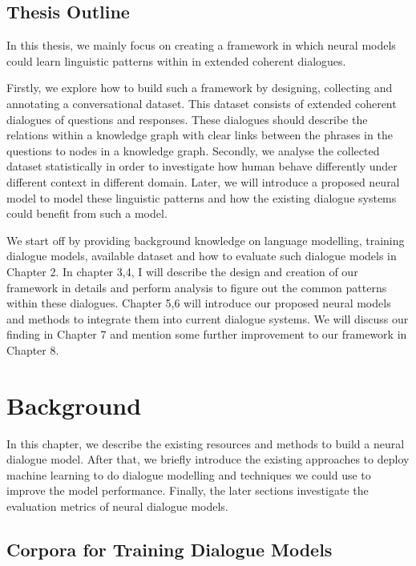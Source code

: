 \documentclass[bsc,frontabs,twoside,singlespacing,parskip,deptreport]{infthesis}     %
\begin{document}
\section {Thesis Outline}

In this thesis, we mainly focus on creating a framework in which neural models could learn linguistic patterns within in extended coherent dialogues.

Firstly, we explore how to build such a framework by designing, collecting and annotating a conversational dataset. This dataset consists of extended coherent dialogues of questions and responses. These dialogues should describe the relations within a knowledge graph with clear links between the phrases in the questions to nodes in a knowledge graph. Secondly, we analyse the collected dataset statistically in order to investigate how human behave differently under different context in different domain. Later, we will introduce a proposed neural model to model these linguistic patterns and how the existing dialogue systems could benefit from such a model.

We start off by providing background knowledge on language modelling, training dialogue models, available dataset and how to evaluate such dialogue models in Chapter 2. In chapter 3,4, I will describe the design and creation of our framework in details and perform analysis to figure out the common patterns within these dialogues. Chapter 5,6 will introduce our proposed neural models and methods to integrate them into current dialogue systems. We will discuss our finding in Chapter 7 and mention some further improvement to our framework in Chapter 8.

\chapter{Background}

In this chapter, we describe the existing resources and methods to build a neural dialogue model. After that, we briefly introduce the existing approaches to deploy machine learning to do dialogue modelling and techniques we could use to improve the model performance. Finally, the later sections investigate the evaluation metrics of neural dialogue models.

\section{Corpora for Training Dialogue Models}
\end{document}
